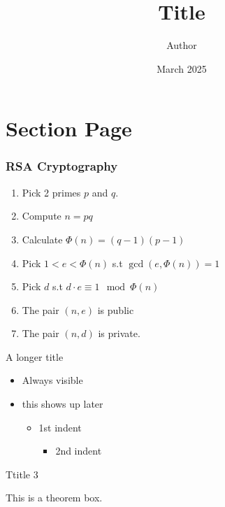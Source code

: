 \documentclass[aspectratio=169, 16pt]{beamer}
\title[Subtitle]{Title}
\author[Short Author]{Author}
\date[Short Date]{March 2025}
\begin{document}
\maketitle

\section{Section Page}

\begin{frame}
	\frametitle{RSA Cryptography}

	\begin{enumerate}
		\item Pick 2 primes $p$ and $q$.
		\item Compute $n = pq$
		\item Calculate $\Phi(n) = (q-1)(p-1)$
		\item Pick $1 < e < \Phi(n)$ s.t $\gcd(e,\Phi(n)) = 1$
		\item Pick $d$ s.t $d\cdot e \equiv 1 \mod \Phi(n)$
		\item The pair $(n,e)$ is public
		\item The pair $(n, d)$ is private.
	\end{enumerate}
\end{frame}

\begin{frame}{A longer title}
	\begin{itemize}
		\item Always visible
		\item<2-> this shows up later
			\begin{itemize}
				\item 1st indent
				      \begin{itemize}
					      \item 2nd indent
				      \end{itemize}
			\end{itemize}
	\end{itemize}
\end{frame}


\begin{frame}{Ttitle 3}
	\begin{theorem}
		This is a theorem box.
	\end{theorem}

\end{frame}

\endpage
\end{document}
